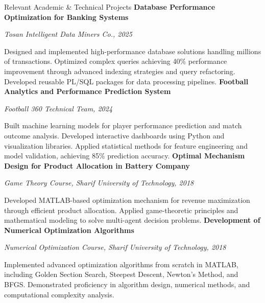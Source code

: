 \begin{rubric}{Relevant Academic \& Technical Projects}
\entry*%
	\textbf{Database Performance Optimization for Banking Systems} 
    \par \emph{Tosan Intelligent Data Miners Co., 2025}
    \par Designed and implemented high-performance database solutions handling millions of transactions. Optimized complex queries achieving 40\% performance improvement through advanced indexing strategies and query refactoring. Developed reusable PL/SQL packages for data processing pipelines.
%
\entry*%
	\textbf{Football Analytics and Performance Prediction System} 
    \par \emph{Football 360 Technical Team, 2024}
    \par Built machine learning models for player performance prediction and match outcome analysis. Developed interactive dashboards using Python and visualization libraries. Applied statistical methods for feature engineering and model validation, achieving 85\% prediction accuracy.
%
\entry*%
	\textbf{Optimal Mechanism Design for Product Allocation in Battery Company} 
    \par \emph{Game Theory Course, Sharif University of Technology, 2018}
    \par Developed MATLAB-based optimization mechanism for revenue maximization through efficient product allocation. Applied game-theoretic principles and mathematical modeling to solve multi-agent decision problems.
%
\entry*
	\textbf{Development of Numerical Optimization Algorithms}
    \par \emph{Numerical Optimization Course, Sharif University of Technology, 2018}
    \par Implemented advanced optimization algorithms from scratch in MATLAB, including Golden Section Search, Steepest Descent, Newton's Method, and BFGS. Demonstrated proficiency in algorithm design, numerical methods, and computational complexity analysis.
%
\end{rubric}

